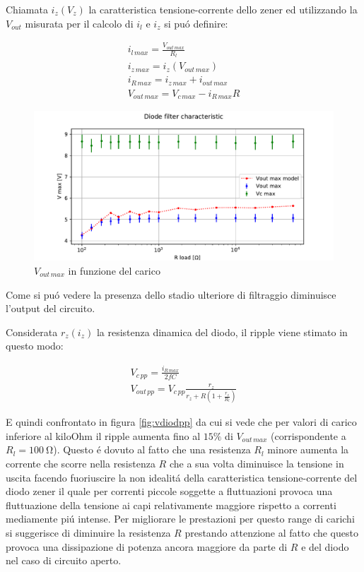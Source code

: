 Chiamata $i_z(V_z)$ la caratteristica tensione-corrente dello zener ed utilizzando la $V_{out}$ misurata per il calcolo di $i_l$ e $i_z$ si pu\'o definire:

\begin{gather}
	i_{l\, max} = \frac{V_{out\, max}}{R_l} \\
	i_{z\, max} = i_z(V_{out\, max}) \\
	i_{R\, max} = i_{z\, max} + i_{out\, max} \\
	V_{out\, max} = V_{c\, max} - i_{R\, max} R
\end{gather}

\begin{figure}[h]
\centering
\includegraphics[width=\textwidth]{fig4.pdf}
\caption{$V_{out\, max}$ in funzione del carico}
\label{fig:vdiod}
\end{figure}

Come si pu\'o vedere la presenza dello stadio ulteriore di filtraggio diminuisce l'output del circuito.

Considerata $r_z(i_z)$ la resistenza dinamica del diodo, il ripple viene stimato in questo modo:

\begin{gather}
	V_{c\, pp} = \frac{i_{R\, max}}{2fC} \\
	V_{out\, pp} = V_{c\, pp} \frac{r_z}{r_z+R(1+\frac{r_z}{R_l})}
\end{gather}

E quindi confrontato in figura \ref{fig:vdiodpp} da cui si vede che per valori di carico inferiore al kiloOhm il ripple aumenta fino al $15\%$ di $V_{out\, max}$ (corrispondente a $R_l=100\ \si{\ohm}$). Questo \'e dovuto al fatto che una resistenza $R_l$ minore aumenta la corrente che scorre nella resistenza $R$ che a sua volta diminuisce la tensione in uscita facendo fuoriuscire la non idealit\'a della caratteristica tensione-corrente del diodo zener il quale per correnti piccole soggette a fluttuazioni provoca una fluttuazione della tensione ai capi relativamente maggiore rispetto a correnti mediamente pi\'u intense. Per migliorare le prestazioni per questo range di carichi si suggerisce di diminuire la resistenza $R$ prestando attenzione al fatto che questo provoca una dissipazione di potenza ancora maggiore da parte di $R$ e del diodo nel caso di circuito aperto.

